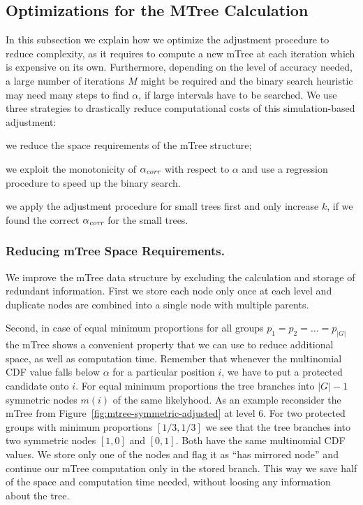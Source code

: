 \subsection{Optimizations for the MTree Calculation}
\label{subsec:mtree-optimization}
In this subsection we explain how we optimize the adjustment procedure to reduce complexity, as it requires to compute a new mTree at each iteration which is expensive on its own. 
%
Furthermore, depending on the level of accuracy needed, a large number of iterations $M$ might be required and the binary search heuristic may need many steps to find $\alpha$, if large intervals have to be searched.
%
We use three strategies to drastically reduce computational costs of this simulation-based adjustment:
%
\begin{inparaenum}[(i)]
%
\item we reduce the space requirements of the mTree structure;
%
\item we exploit the monotonicity of $\alpha_\textit{corr}$ with respect to $\alpha$ and use a regression procedure to speed up the binary search.
%
\item we apply the adjustment procedure for small trees first and only increase $k$, if we found the correct  $\alpha_\textit{corr}$ for the small trees.
\end{inparaenum}

\subsubsection{Reducing mTree Space Requirements.} 
\label{subsubsec:reducing-space-requirements}
We improve the mTree data structure by excluding the calculation and storage of redundant information.
%
First we store each node only once at each level and duplicate nodes are combined into a single node with multiple parents.

Second, in case of equal minimum proportions for all groups $p_1 = p_2 = \ldots = p_|G|$ the mTree shows a convenient property that we can use to reduce additional space, as well as computation time.
%
Remember that whenever the multinomial CDF value falls below $\alpha$ for a particular position $i$, we have to put a protected candidate onto $i$.
%
For equal minimum proportions the tree branches into $|G| - 1$ symmetric nodes $m(i)$ of the same likelyhood.
%
As an example reconsider the mTree from Figure~\ref{fig:mtree-symmetric-adjusted} at level 6.
%
For two protected groups with minimum proportions $[1/3, 1/3]$ we see that the tree branches into two symmetric nodes $[1, 0]$ and $[0,1]$.
%
Both have the same multinomial CDF values.
%
We store only one of the nodes and flag it as ``has mirrored node'' and continue our mTree computation only in the stored branch.
%
This way we save half of the space and computation time needed, without loosing any information about the tree.

